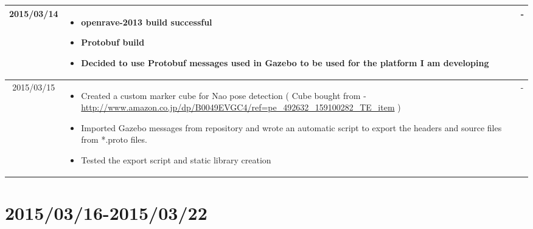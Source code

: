 \documentclass[11pt]{article} %
\begin{document}
\begin{center}
\begin{longtable}{ | c | p{6cm} | p{5cm} |}
	 2015/03/14         & 
  \begin{itemize}
  \item openrave-2013 build successful
  \item Protobuf build
  \item Decided to use Protobuf messages used in Gazebo to be used for the platform I am developing
\end{itemize}   
  & 
-  					\\					 \hline  	

2015/03/15         & 
  \begin{itemize}
  \item Created a custom marker cube for Nao pose detection ( Cube bought from - \url{http://www.amazon.co.jp/dp/B0049EVGC4/ref=pe_492632_159100282_TE_item} )
  \item Imported Gazebo messages from repository and wrote an automatic script to export the headers and source files from *.proto files.
  \item Tested the export script and static library creation
\end{itemize}   
  & 
-  					\\					 \hline  										 
  										   										 
    \end{longtable}
\end{center}

\newpage
\section{2015/03/16-2015/03/22}
\end{document}
